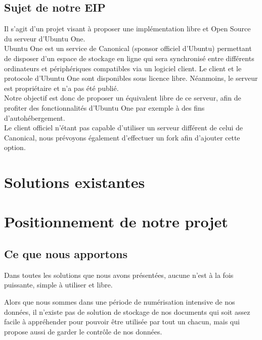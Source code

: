 \documentclass[12pt]{report}
\begin{document}
\section{Sujet de notre EIP}
    Il s’agit d’un projet visant à proposer une implémentation libre et Open Source du serveur d’Ubuntu One.\\

    Ubuntu One est un service de Canonical (sponsor officiel d'Ubuntu) permettant de disposer d’un espace de stockage en ligne qui sera synchronisé entre différents ordinateurs et périphériques compatibles via un logiciel client. Le client et le protocole d’Ubuntu One sont disponibles sous licence libre. Néanmoins, le serveur est propriétaire et n’a pas été publié.\\


    Notre objectif est donc de proposer un équivalent libre de ce serveur, afin
    de profiter des fonctionnalités d’Ubuntu One par exemple à des fins d’autohébergement.\\

    Le client officiel n’étant pas capable d’utiliser un serveur différent de celui
    de Canonical, nous prévoyons également d'effectuer un fork afin d'ajouter cette option.

\thispagestyle{EIP} %

\chapter{Solutions existantes}










\chapter{Positionnement de notre projet}
\section{Ce que nous apportons}
Dans toutes les solutions que nous avons présentées, aucune n'est à la fois puissante, simple à utiliser et libre.

Alors que nous sommes dans une période de numérisation intensive de nos données, il n'existe pas de solution de stockage de nos documents qui soit assez facile à appréhender pour pouvoir être utilisée par tout un chacun, mais qui propose aussi de garder le contrôle de nos données.
\end{document}
